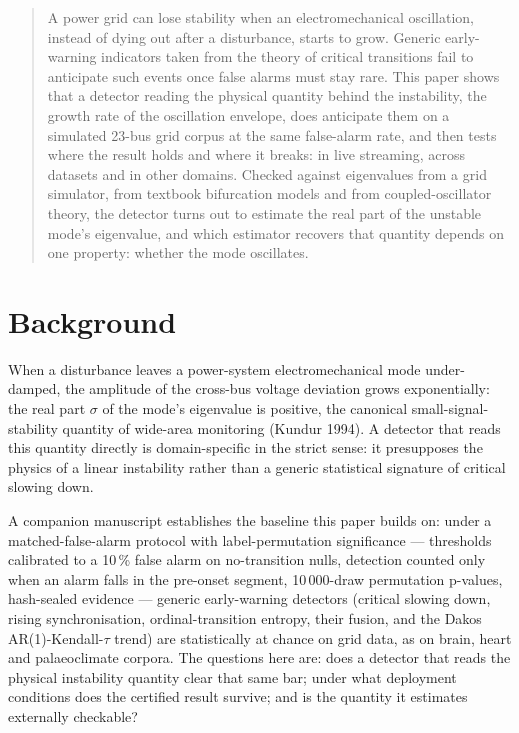 \documentclass[aip,cha,preprint,amsmath,amssymb]{revtex4-2}
\begin{document}
\begin{quotation}
A power grid can lose stability when an electromechanical oscillation,
instead of dying out after a disturbance, starts to grow. Generic
early-warning indicators taken from the theory of critical transitions
fail to anticipate such events once false alarms must stay rare. This
paper shows that a detector reading the physical quantity behind the
instability, the growth rate of the oscillation envelope, does
anticipate them on a simulated 23-bus grid corpus at the same
false-alarm rate, and then tests where the result holds and where it
breaks: in live streaming, across datasets and in other domains.
Checked against eigenvalues from a grid simulator, from textbook
bifurcation models and from coupled-oscillator theory, the detector
turns out to estimate the real part of the unstable mode's eigenvalue,
and which estimator recovers that quantity depends on one property:
whether the mode oscillates.
\end{quotation}

\section{Background}\label{sec:background}

When a disturbance leaves a power-system electromechanical mode
under-damped, the amplitude of the cross-bus voltage deviation grows
exponentially: the real part $\sigma$ of the mode's eigenvalue is
positive, the canonical small-signal-stability quantity of wide-area
monitoring (Kundur 1994). A detector that reads this quantity directly
is domain-specific in the strict sense: it presupposes the physics of a
linear instability rather than a generic statistical signature of
critical slowing down.

A companion manuscript establishes the baseline this paper builds on:
under a matched-false-alarm protocol with label-permutation
significance --- thresholds calibrated to a 10\,\% false alarm on
no-transition nulls, detection counted only when an alarm falls in the
pre-onset segment, 10\,000-draw permutation p-values, hash-sealed
evidence --- generic early-warning detectors (critical slowing down,
rising synchronisation, ordinal-transition entropy, their fusion, and
the Dakos AR(1)-Kendall-$\tau$ trend) are statistically at chance on
grid data, as on brain, heart and palaeoclimate corpora. The questions
here are: does a detector that reads the physical instability quantity
clear that same bar; under what deployment conditions does the
certified result survive; and is the quantity it estimates externally
checkable?
\end{document}
